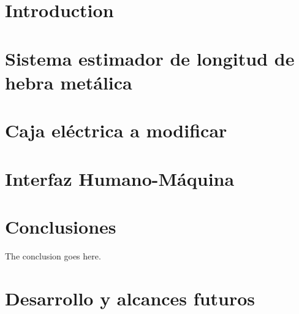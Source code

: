 \documentclass[conference]{IEEEtran}
\begin{document}
\section{Introduction}


\section{Sistema estimador de longitud de hebra metálica}
\label{sec:estimador}


\section{Caja eléctrica a modificar}


\section{Interfaz Humano-Máquina}
\label{sec:HMI}


\section{Conclusiones}
The conclusion goes here.


\section{Desarrollo y alcances futuros}


\section*{}

\end{document}
